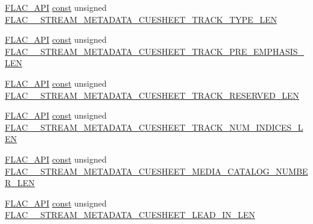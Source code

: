 \begin{DoxyCompactItemize}
\item 
\hyperlink{group__flac__export_ga56ca07df8a23310707732b1c0007d6f5}{F\+L\+A\+C\+\_\+\+A\+PI} \hyperlink{zconf_8h_a2c212835823e3c54a8ab6d95c652660e}{const} unsigned \hyperlink{group__flac__format_ga214d2c105a5712dea76c0a9802843fba}{F\+L\+A\+C\+\_\+\+\_\+\+S\+T\+R\+E\+A\+M\+\_\+\+M\+E\+T\+A\+D\+A\+T\+A\+\_\+\+C\+U\+E\+S\+H\+E\+E\+T\+\_\+\+T\+R\+A\+C\+K\+\_\+\+T\+Y\+P\+E\+\_\+\+L\+EN}
\item 
\hyperlink{group__flac__export_ga56ca07df8a23310707732b1c0007d6f5}{F\+L\+A\+C\+\_\+\+A\+PI} \hyperlink{zconf_8h_a2c212835823e3c54a8ab6d95c652660e}{const} unsigned \hyperlink{group__flac__format_gaa50843400f847963958b622e32c7afb1}{F\+L\+A\+C\+\_\+\+\_\+\+S\+T\+R\+E\+A\+M\+\_\+\+M\+E\+T\+A\+D\+A\+T\+A\+\_\+\+C\+U\+E\+S\+H\+E\+E\+T\+\_\+\+T\+R\+A\+C\+K\+\_\+\+P\+R\+E\+\_\+\+E\+M\+P\+H\+A\+S\+I\+S\+\_\+\+L\+EN}
\item 
\hyperlink{group__flac__export_ga56ca07df8a23310707732b1c0007d6f5}{F\+L\+A\+C\+\_\+\+A\+PI} \hyperlink{zconf_8h_a2c212835823e3c54a8ab6d95c652660e}{const} unsigned \hyperlink{group__flac__format_ga1a469393239653b050c7cc3484d33bef}{F\+L\+A\+C\+\_\+\+\_\+\+S\+T\+R\+E\+A\+M\+\_\+\+M\+E\+T\+A\+D\+A\+T\+A\+\_\+\+C\+U\+E\+S\+H\+E\+E\+T\+\_\+\+T\+R\+A\+C\+K\+\_\+\+R\+E\+S\+E\+R\+V\+E\+D\+\_\+\+L\+EN}
\item 
\hyperlink{group__flac__export_ga56ca07df8a23310707732b1c0007d6f5}{F\+L\+A\+C\+\_\+\+A\+PI} \hyperlink{zconf_8h_a2c212835823e3c54a8ab6d95c652660e}{const} unsigned \hyperlink{group__flac__format_ga34226e52846bbcba46b278f297880637}{F\+L\+A\+C\+\_\+\+\_\+\+S\+T\+R\+E\+A\+M\+\_\+\+M\+E\+T\+A\+D\+A\+T\+A\+\_\+\+C\+U\+E\+S\+H\+E\+E\+T\+\_\+\+T\+R\+A\+C\+K\+\_\+\+N\+U\+M\+\_\+\+I\+N\+D\+I\+C\+E\+S\+\_\+\+L\+EN}
\item 
\hyperlink{group__flac__export_ga56ca07df8a23310707732b1c0007d6f5}{F\+L\+A\+C\+\_\+\+A\+PI} \hyperlink{zconf_8h_a2c212835823e3c54a8ab6d95c652660e}{const} unsigned \hyperlink{group__flac__format_ga2f453e18dc7e33456cdd744ee7926f83}{F\+L\+A\+C\+\_\+\+\_\+\+S\+T\+R\+E\+A\+M\+\_\+\+M\+E\+T\+A\+D\+A\+T\+A\+\_\+\+C\+U\+E\+S\+H\+E\+E\+T\+\_\+\+M\+E\+D\+I\+A\+\_\+\+C\+A\+T\+A\+L\+O\+G\+\_\+\+N\+U\+M\+B\+E\+R\+\_\+\+L\+EN}
\item 
\hyperlink{group__flac__export_ga56ca07df8a23310707732b1c0007d6f5}{F\+L\+A\+C\+\_\+\+A\+PI} \hyperlink{zconf_8h_a2c212835823e3c54a8ab6d95c652660e}{const} unsigned \hyperlink{group__flac__format_ga5b9607000b777c7a7be84062754e0363}{F\+L\+A\+C\+\_\+\+\_\+\+S\+T\+R\+E\+A\+M\+\_\+\+M\+E\+T\+A\+D\+A\+T\+A\+\_\+\+C\+U\+E\+S\+H\+E\+E\+T\+\_\+\+L\+E\+A\+D\+\_\+\+I\+N\+\_\+\+L\+EN}

\end{DoxyCompactItemize}
